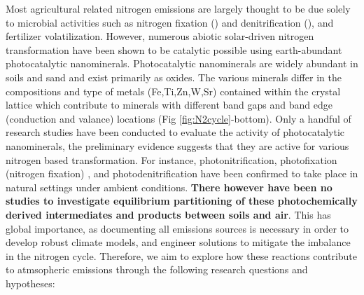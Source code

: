 Most agricultural related nitrogen emissions are largely thought to be due solely to microbial activities such as nitrogen fixation (\NH) and denitrification (\NO), and fertilizer volatilization. However, numerous abiotic solar-driven nitrogen transformation have been shown to be catalytic possible using earth-abundant photocatalytic nanominerals\cite{doane2017abiotic}. Photocatalytic nanominerals are widely abundant in soils and sand and exist primarily as oxides. The various minerals differ in the compositions and type of metals (Fe,Ti,Zn,W,Sr) contained within the crystal lattice which contribute to minerals with different band gaps and band edge (conduction and valance) locations (Fig \ref{fig:N2cycle}-bottom). Only a handful of research studies have been conducted to evaluate the activity of photocatalytic nanominerals, the preliminary evidence suggests that they are active for various nitrogen based transformation. For instance,  photonitrification\cite{DHAR_1932,DHAR_1933,DHAR_1934,mclean1965reactions,kebede2013photooxidation}, photofixation (nitrogen fixation) \cite{dhar1941new,DHAR_1944,Schrauzer1977}, and photodenitrification \cite{cunningham1971reactions,blyholder1971photocatalytic} have been confirmed to take place in natural settings under ambient conditions\cite{doane2017abiotic}. \textbf{There however have been no studies to investigate equilibrium partitioning of these photochemically derived intermediates and products between soils and air}. This has global importance, as documenting all emissions sources is necessary in order to develop robust climate models, and engineer solutions to mitigate the imbalance in the nitrogen cycle. Therefore, we aim to explore how these reactions contribute to atmsopheric emissions through the following research questions and hypotheses:  


\vspace{2mm}

